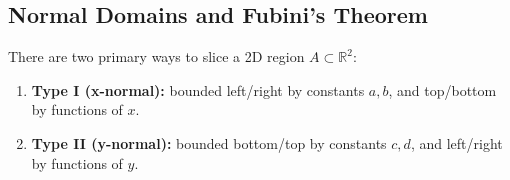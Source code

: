 \setcounter{section}{\value{savedSec}}
\setcounter{theorem}{\value{savedThm}}

\subsection{Normal Domains and Fubini's Theorem}

\begin{theorem*}
There are two primary ways to slice a 2D region $A \subset \mathbb{R}^2$:
\begin{enumerate}
    \item \textbf{Type I (x-normal):} bounded left/right by constants $a, b$, and top/bottom by functions of $x$.
    \item \textbf{Type II (y-normal):} bounded bottom/top by constants $c, d$, and left/right by functions of $y$.
\end{enumerate}
\end{theorem*}

